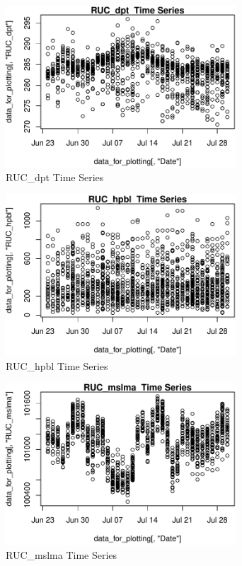 \begin{figure} 
\centering  
\includegraphics[width=0.77\textwidth]{Code_Outputs/ML_input_report_AllforCaret_cleaned_StepPractice_part_practice_RUC_dptTS.pdf} 
\caption{\label{fig:ML_input_report_AllforCaret_cleaned_StepPractice_part_practiceRUC_dptTS}RUC_dpt  Time Series} 
\end{figure} 
 

\begin{figure} 
\centering  
\includegraphics[width=0.77\textwidth]{Code_Outputs/ML_input_report_AllforCaret_cleaned_StepPractice_part_practice_RUC_hpblTS.pdf} 
\caption{\label{fig:ML_input_report_AllforCaret_cleaned_StepPractice_part_practiceRUC_hpblTS}RUC_hpbl  Time Series} 
\end{figure} 
 

\begin{figure} 
\centering  
\includegraphics[width=0.77\textwidth]{Code_Outputs/ML_input_report_AllforCaret_cleaned_StepPractice_part_practice_RUC_mslmaTS.pdf} 
\caption{\label{fig:ML_input_report_AllforCaret_cleaned_StepPractice_part_practiceRUC_mslmaTS}RUC_mslma  Time Series} 
\end{figure} 
 

